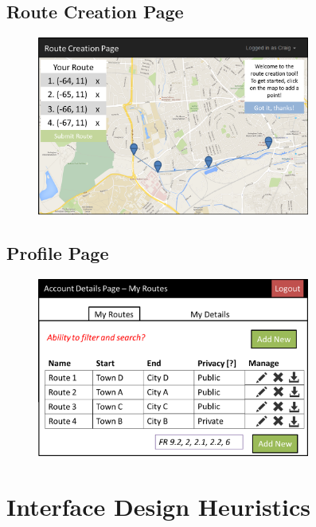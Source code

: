 \subsection{Route Creation Page}
\begin{figure}[!ht]
	\begin{center}
		\includegraphics[width=0.8\textwidth]{images/appendix/rcp1.png}
	\end{center}
	\vspace{-6mm}
\end{figure}

\subsection{Profile Page}
\begin{figure}[!ht]
	\begin{center}
		\includegraphics[width=0.8\textwidth]{images/appendix/prof1.png}
	\end{center}
	\vspace{-6mm}
\end{figure}


\newpage 
\section{Interface Design Heuristics}
\label{sec:idh}


